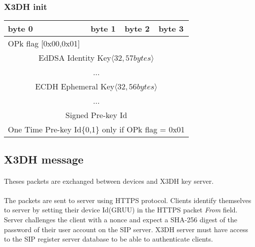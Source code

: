 \documentclass[a4paper,11pt]{article}
\begin{document}
      \subsubsection{X3DH init}
      \begin{center}
      \begin{tabular}{ | p{1.4in} | p{1.4in} | p{1.4in} | p{1.4in} |}
        \hline
        \cellcolor[gray]{0.85} byte 0 & \cellcolor[gray]{0.85} byte 1 & \cellcolor[gray]{0.85} byte 2 & \cellcolor[gray]{0.85}byte 3\\
        \hline
        OPk flag [0x00,0x01]&\multicolumn{3}{|c|}{}\\
        \cline{1-1}
        \multicolumn{4}{|c|}{EdDSA Identity Key$\langle 32,57bytes\rangle $}\\
        \multicolumn{4}{|c|}{...}\\
        \hline
        \multicolumn{4}{|c|}{ ECDH Ephemeral Key$\langle 32,56bytes\rangle $}\\
        \multicolumn{4}{|c|}{...}\\
        \hline
        \multicolumn{4}{|c|}{Signed Pre-key Id}\\
        \hline
        \multicolumn{4}{|c|}{One Time Pre-key Id\{0,1\} only if OPk flag = 0x01}\\
        \hline
      \end{tabular}
      \end{center}

  \subsection{X3DH message}
    \paragraph{}Theses packets are exchanged between devices and X3DH key server.
    \paragraph*{}The packets are sent to server using HTTPS protocol. Clients identify themselves to server by setting their device Id(GRUU) in the HTTPS packet \textit{From} field. Server challenges the client with a nonce and expect a SHA-256 digest of the password of their user account on the SIP server. X3DH server must have access to the SIP register server database to be able to authenticate clients.
\end{document}
